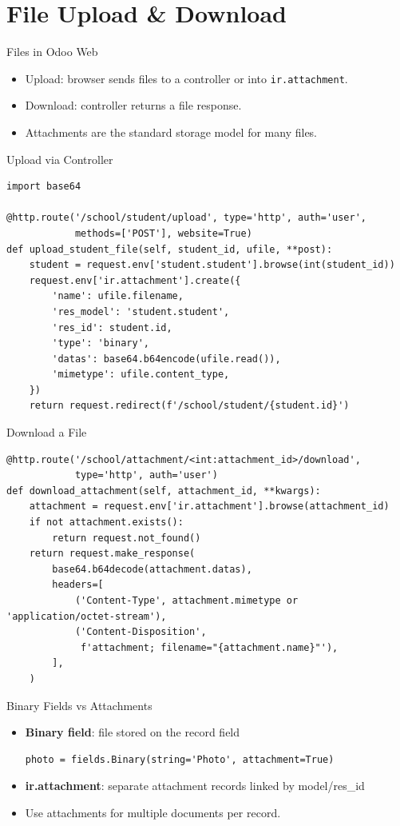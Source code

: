 \section{File Upload \& Download}

\begin{frame}[fragile]{Files in Odoo Web}
	\begin{itemize}
		\item Upload: browser sends files to a controller or into \texttt{ir.attachment}.
		\item Download: controller returns a file response.
		\item Attachments are the standard storage model for many files.
	\end{itemize}
\end{frame}

\begin{frame}[fragile]{Upload via Controller}
\begin{lstlisting}
import base64

@http.route('/school/student/upload', type='http', auth='user',
			methods=['POST'], website=True)
def upload_student_file(self, student_id, ufile, **post):
	student = request.env['student.student'].browse(int(student_id))
	request.env['ir.attachment'].create({
		'name': ufile.filename,
		'res_model': 'student.student',
		'res_id': student.id,
		'type': 'binary',
		'datas': base64.b64encode(ufile.read()),
		'mimetype': ufile.content_type,
	})
	return request.redirect(f'/school/student/{student.id}')
\end{lstlisting}
\end{frame}

\begin{frame}[fragile]{Download a File}
\begin{lstlisting}
@http.route('/school/attachment/<int:attachment_id>/download',
			type='http', auth='user')
def download_attachment(self, attachment_id, **kwargs):
	attachment = request.env['ir.attachment'].browse(attachment_id)
	if not attachment.exists():
		return request.not_found()
	return request.make_response(
		base64.b64decode(attachment.datas),
		headers=[
			('Content-Type', attachment.mimetype or 'application/octet-stream'),
			('Content-Disposition',
			 f'attachment; filename="{attachment.name}"'),
		],
	)
\end{lstlisting}
\end{frame}

\begin{frame}[fragile]{Binary Fields vs Attachments}
	\begin{itemize}
		\item \textbf{Binary field}: file stored on the record field
\begin{lstlisting}
photo = fields.Binary(string='Photo', attachment=True)
\end{lstlisting}
		\item \textbf{ir.attachment}: separate attachment records linked by model/res\_id
		\item Use attachments for multiple documents per record.
	\end{itemize}
\end{frame}

